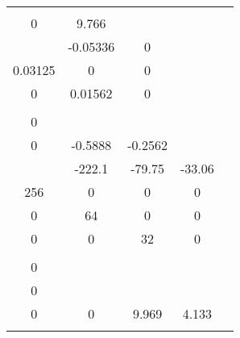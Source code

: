 \documentclass[runningheads,a4paper]{llncs}
\begin{document}
\begin{table}[htb]
\begin{tabular}{|c|c|c|c|c|}
\begin{array}{c}
8 \\ 0
\end{array}\right]$ & $\left[\begin{array}{cc}
0	& 9.766 	\\
\end{array}\right]$ & 0 \\ \hline
\begin{tabular}[c]{@{}c@{}}Magnetic\\ Pointer \end{tabular} & $\left[\begin{array}{ccc}
-0.271		& -0.05336	& 0	\\
0.03125		& 0			& 0	\\
0			& 0.01562 	& 0	\\	
\end{array}\right]$ & $\left[\begin{array}{c}
1 \\ 0 \\ 0
\end{array}\right]$ & $\left[\begin{array}{ccc}
0	& -0.5888	& -0.2562 \\
\end{array}\right]$ & 0           \\ \hline
\begin{tabular}[c]{@{}c@{}}1/4 Car\\ Suspension\end{tabular} & $
\left[\begin{array}{cccc}
-516.1	& -222.1& -79.75& -33.06	\\
256		& 0		& 0		& 0			\\
0		& 64 	& 0		& 0 \\
0		& 0		& 32 	& 0 \\	
\end{array}\right]$ & $\left[\begin{array}{c}
8 \\ 0 \\ 0 \\ 0
\end{array}\right]$ & $\left[\begin{array}{cccc}
0	& 0	& 9.969 & 4.133 \\
\end{array}\right]$ & 0 \\ \hline
\begin{tabular}[c]{@{}c@{}}Computer\\ Tape\\ Driver\end{tabular} & $\left[\begin{array}{ccc}

\end{array}
\end{tabular}
\end{table}
\end{document}
